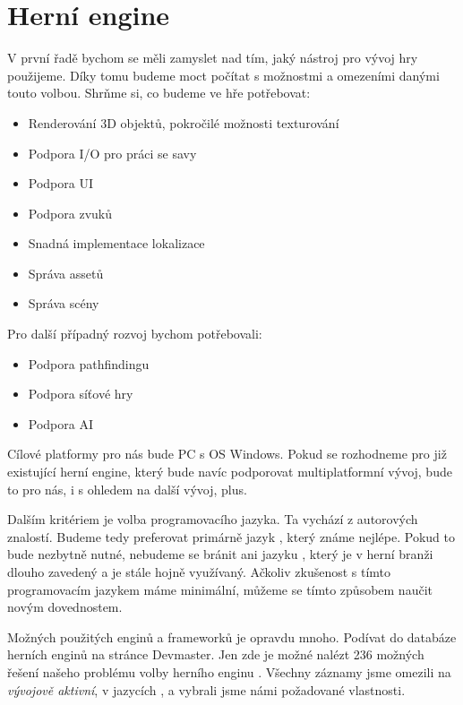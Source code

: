 
\section{Herní engine}
V první řadě bychom se měli zamyslet nad tím, jaký nástroj pro vývoj hry použijeme. Díky tomu budeme moct počítat s možnostmi a omezeními danými touto volbou. Shrňme si, co budeme ve hře potřebovat:

\begin{itemize}
	\item Renderování 3D objektů, pokročilé možnosti texturování
	\item Podpora I/O pro práci se savy
	\item Podpora UI
	\item Podpora zvuků
	\item Snadná implementace lokalizace
	\item Správa assetů
	\item Správa scény
	
\end{itemize}

Pro další případný rozvoj bychom potřebovali:

\begin{itemize}
	\item Podpora pathfindingu
	\item Podpora síťové hry
	\item Podpora AI
\end{itemize}

Cílové platformy pro nás bude PC s OS Windows. Pokud se rozhodneme pro již existující herní engine, který bude navíc podporovat multiplatformní vývoj, bude to pro nás, i s ohledem na další vývoj, plus.

Dalším kritériem je volba programovacího jazyka. Ta vychází z autorových znalostí. Budeme tedy preferovat primárně jazyk \CS{}, který známe nejlépe. Pokud to bude nezbytně nutné, nebudeme se bránit ani jazyku \CPP{}, který je v herní branži dlouho zavedený a je stále hojně využívaný. Ačkoliv zkušenost s tímto programovacím jazykem máme minimální, můžeme se tímto způsobem naučit novým dovednostem.


Možných použitých enginů a frameworků je opravdu mnoho. Podívat do databáze herních enginů na stránce Devmaster. Jen zde je možné nalézt 236 možných řešení našeho problému volby herního enginu \citep{engines_list}. Všechny záznamy jsme omezili na \textit{vývojově aktivní}, v jazycích \CS{}, \CPP{} a vybrali jsme námi požadované vlastnosti.

